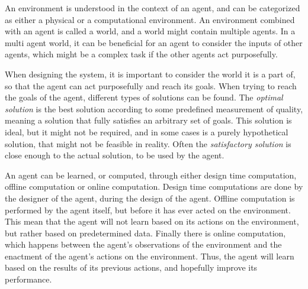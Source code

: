 An environment is understood in the context of an agent, and can be categorized as either a physical or a computational environment.
An environment combined with an agent is called a world, and a world might contain multiple agents.
In a multi agent world, it can be beneficial for an agent to consider the inputs of other agents, which might be a complex task if the other agents act purposefully.

When designing the system, it is important to consider the world it is a part of, so that the agent can act purposefully and reach its goals.
When trying to reach the goals of the agent, different types of solutions can be found.
The \textit{optimal solution} is the best solution according to some predefined measurement of quality, meaning a solution that fully satisfies an arbitrary set of goals.
This solution is ideal, but it might not be required, and in some cases is a purely hypothetical solution, that might not be feasible in reality.
Often the \textit{satisfactory solution} is close enough to the actual solution, to be used by the agent.


An agent can be learned, or computed, through either design time computation, offline computation or online computation.
Design time computations are done by the designer of the agent, during the design of the agent.
Offline computation is performed by the agent itself, but before it has ever acted on the environment.
This mean that the agent will not learn based on its actions on the environment, but rather based on predetermined data.
Finally there is online computation, which happens between the agent's observations of the environment and the enactment of the agent's actions on the environment.
Thus, the agent will learn based on the results of its previous actions, and hopefully improve its performance.
